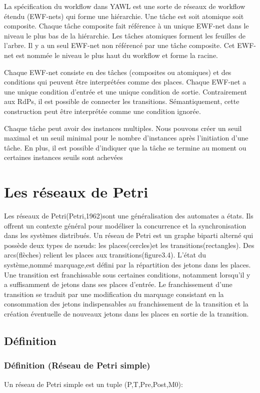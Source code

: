 La spécification du workflow dans YAWL est une sorte de réseaux de workflow étendu (EWF-nets) qui forme une hiérarchie. Une tâche est soit atomique soit composite. Chaque tâche composite fait référence à un unique EWF-net dans le niveau le plus bas de la hiérarchie. Les tâches atomiques forment les feuilles de l'arbre. Il y a un seul EWF-net non référencé par une tâche composite. Cet EWF-net est nommée le niveau le plus haut du workflow et forme la racine. 

Chaque EWF-net consiste en des tâches (composites ou atomiques) et des conditions qui peuvent être interprétées comme des places. 
Chaque EWF-net a une unique condition d'entrée et une unique condition de sortie. Contrairement aux RdPs, il est possible de connecter les transitions. Sémantiquement, cette construction peut être interprétée comme une condition ignorée.

Chaque tâche peut avoir des instances multiples. Nous pouvons créer un seuil maximal et un seuil minimal pour le nombre d'instances après l'initiation d'une tâche. En plus, il est possible d'indiquer que la tâche se termine au moment ou certaines instances seuils sont achevées

\section{Les réseaux de Petri}

Les réseaux de Petri(Petri,1962)sont une généralisation des automates a états. Ils offrent un contexte général pour modéliser la concurrence et la synchronisation dans les systèmes distribués. Un réseau de Petri est un graphe biparti alterné qui possède deux types de nœuds: les places(cercles)et les transitions(rectangles). Des arcs(flèches) relient les places aux transitions(figure3.4). L'état du système,nommé marquage,est défini par la répartition des jetons dans les places. Une transition est franchissable sous certaines conditions, notamment lorsqu'il y a suffisamment de jetons dans ses places d’entrée. Le franchissement d’une transition se traduit par une modification du marquage consistant en la consommation des jetons indispensables au franchissement de la transition et la création éventuelle de nouveaux jetons dans les places en sortie de la transition.

\subsection{Définition}
\subsubsection{Définition (Réseau de Petri simple)}
Un réseau de Petri simple est un tuple
 (P,T,Pre,Post,M0):
 
